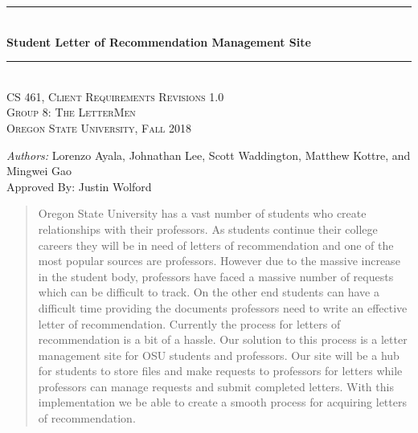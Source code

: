 \documentclass[onecolumn, draftclsnofoot,10pt, compsoc]{IEEEtran}
\newcommand{\NameSigPair}[1]{\par
\makebox[2.75in][r]{#1} \hfil 	\makebox[3.25in]{\makebox[2.25in]{\hrulefill} \hfill		\makebox[.75in]{\hrulefill}}
\par\vspace{-12pt} \textit{\tiny\noindent
\makebox[2.75in]{} \hfil		\makebox[3.25in]{\makebox[2.25in][r]{Signature} \hfill	\makebox[.75in][r]{Date}}}}
\begin{document}
\begin{titlepage}
    \newcommand{\HRule}{\rule{\linewidth}{0.5mm}}
    \center 
    \HRule \\[0.4cm]
    { \Large \bfseries Student Letter of Recommendation Management Site}\\[0.4cm] 
    \HRule \\[0.5cm]
    \center 
    \textsc{\Large CS 461, Client Requirements Revisions 1.0}\\[0.5cm] 
    \textsc{\Large Group 8: The LetterMen}\\[0.5cm]
    \textsc{\Large Oregon State University, Fall 2018}\\[0.5cm] 
    \begin{minipage}{0.4\textwidth}
        \begin{center} \large
        \emph{Authors:} Lorenzo Ayala, Johnathan Lee, Scott Waddington, Matthew Kottre, and Mingwei Gao\\
         \vspace{20pt}
          {\large Approved By: Justin Wolford}\par
            {\Large\NameSigPair\par}
        \end{center}
    \end{minipage}
    \vspace{2cm}
    \begin{abstract}
    Oregon State University has a vast number of students who create relationships with their professors. As students continue their college careers they will be in need of letters of recommendation and one of the most popular sources are professors. However due to the massive increase in the student body, professors have faced a massive number of requests which can be difficult to track. On the other end students can have a difficult time providing the documents professors need to write an effective letter of recommendation. Currently the process for letters of recommendation is a bit of a hassle. Our solution to this process is a letter management site for OSU students and professors. Our site will be a hub for students to store files and make requests to professors for letters while professors can manage requests and submit completed letters. With this implementation we be able to create a smooth process for acquiring letters of recommendation.  
    \end{abstract}
    \vfill %
\end{titlepage}
\newpage
{}
\tableofcontents
\clearpage
\end{document}
